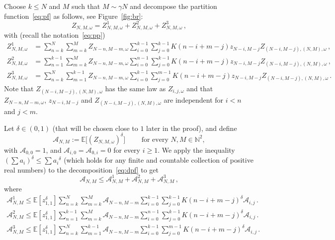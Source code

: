\documentclass[AHL,Unicode,longabstracts]{cedram}
\newcommand{\cA}{\ensuremath{\mathcal{A}}}
\newcommand{\bbE}{\ensuremath{\mathbb{E}}}
\newcommand{\bbN}{\ensuremath{\mathbb{N}}}
\begin{document}
Choose $k \le N$ and $M $ such that $M \sim \gamma N $ and decompose the partition function~\eqref{eq:pf} as follows, see Figure~\ref{fig:br}:
\begin{equation}\label{eq:dpf}
Z_{N,M,\omega}= Z_{N,M,\omega}^1 + Z_{N,M,\omega}^2 + Z_{N,M,\omega}^3\,,
\end{equation}
with (recall the notation~\eqref{eq:pp})
\[
\begin{split}
Z_{N,M,\omega}^1 &= \sum_{n=k}^N \sum_{m=k}^M Z_{N-n,M-m,\omega} \sum_{i=0}^{k-1} \sum_{j=0}^{k-1} K(n-i+m-j) z_{N-i,M-j} Z_{(N-i,M-j),(N,M),\omega}\,,\\
Z_{N,M,\omega}^2 &= \sum_{n=1}^{k-1} \sum_{m=k}^M Z_{N-n,M-m,\omega} \sum_{i=0}^{n-1} \sum_{j=0}^{k-1} K(n-i+m-j) z_{N-i,M-j} Z_{(N-i,M-j),(N,M),\omega}\,,\\
Z_{N,M,\omega}^3&= \sum_{n=k}^N \sum_{m=1}^{k-1} Z_{N-n,M-m,\omega} \sum_{i=0}^{k-1} \sum_{j=0}^{m-1} K(n-i+m-j) z_{N-i,M-j} Z_{(N-i,M-j),(N,M),\omega}\,.
\end{split}
\]
Note that $Z_{(N-i,M-j),(N,M),\omega}$ has the same law as $Z_{i,j,\omega}$ and that $Z_{N-n,M-m,\omega}$, $ z_{N-i,M-j}$ and $Z_{(N-i,M-j),(N,M),\omega}$ are independent for $i < n$ and $j <m$.


Let $\delta \in (0,1)$ (that will be chosen close to $1$ later in the proof), and define
\begin{equation}
\cA_{N,M} := \bbE \Big[{\left(Z_{N,M,\omega} \right)}^{\delta} \Big] \qquad \text{ for every } N,M \in \bbN^2,
\end{equation}
with $\cA_{0,0}=1$, and $\cA_{i,0}= \cA_{0,i}=0$ for every $i\ge 1$. We apply the inequality ${ \left(\sum a_i \right) }^\delta \le \sum {a_i}^\delta$ (which holds for any finite and countable collection of positive real numbers) to the decomposition~\eqref{eq:dpf} to get
\begin{equation}\label{eq:A123}
\cA_{N,M} \le \cA_{N,M}^1 + \cA_{N,M}^2 + \cA_{N,M}^3\,,
\end{equation}
where
\begin{equation}
\begin{split}
\cA_{N,M}^1 \le \bbE[z_{1,1}^\delta] \sum_{n=k}^N \sum_{m=k}^M \cA_{N-n,M-m} \sum_{i=0}^{k-1} \sum_{j=0}^{k-1} K(n-i+m-j)^\delta \cA_{i,j}\,.\\
\cA_{N,M}^2 \le \bbE[z_{1,1}^\delta] \sum_{n=1}^{k-1} \sum_{m=k}^M \cA_{N-n,M-m} \sum_{i=0}^{n-1} \sum_{j=0}^{k-1} K(n-i+m-j)^\delta \cA_{i,j}\,.\\
\cA_{N,M}^3 \le \bbE[z_{1,1}^\delta] \sum_{n=k}^N \sum_{m=1}^{k-1} \cA_{N-n,M-m} \sum_{i=0}^{k-1} \sum_{j=0}^{m-1} K(n-i+m-j)^\delta \cA_{i,j}\,.
\end{split}
\end{equation}
\end{document}
